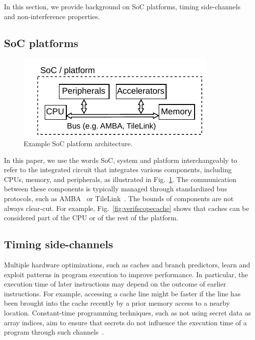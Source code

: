 In this section, we provide background on SoC platforms, timing side-channels and non-interference properties.

\subsection{SoC platforms}

\begin{figure}[t]
    \begin{center}
    \includegraphics[width=0.8\columnwidth]{figures/exampleplatform/exampleplatform.pdf}
    \end{center}
    \vspace*{-1em}
    \caption{\label{fig:exampleplatform}
        Example SoC platform architecture.
    }
    \vspace*{-1em}
\end{figure}

In this paper, we use the words SoC, system and platform interchangeably to refer to the integrated circuit that integrates various components, including CPUs, memory, and peripherals, as illustrated in Fig.~\ref{fig:exampleplatform}.
The communication between these components is typically managed through standardized bus protocols, such as AMBA~\cite{arm_amba} or TileLink~\cite{tilelink_spec}.
The bounds of components are not always clear-cut.
For example, Fig.~\ref{fig:verifscopecache} shows that caches can be considered part of the CPU or of the rest of the platform.

\subsection{Timing side-channels}

Multiple hardware optimizations, such as caches and branch predictors, learn and exploit patterns in program execution to improve performance.
In particular, the execution time of later instructions may depend on the outcome of earlier instructions.
For example, accessing a cache line might be faster if the line has been brought into the cache recently by a prior memory access to a nearby location.
Constant-time programming techniques, such as not using secret data as array indices, aim to ensure that secrets do not influence the execution time of a program through such channels~\cite{OsvikShamirTromer2006CacheAES,AlmeidaEtAl2016CTVerif}.

